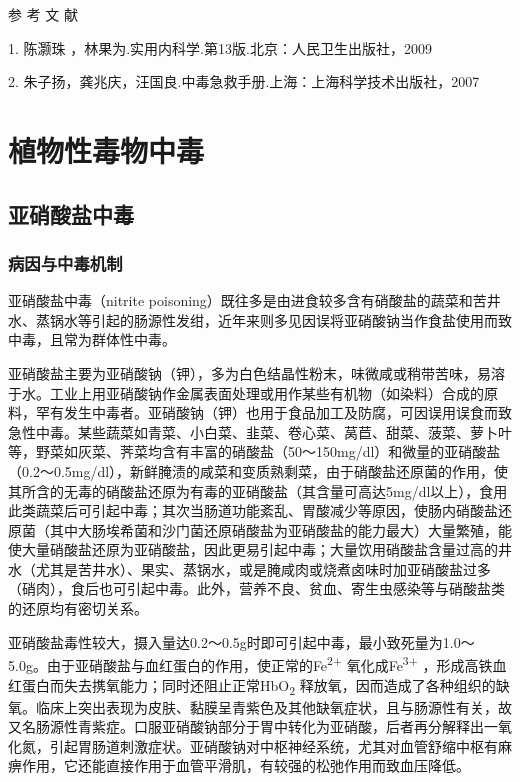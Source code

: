 \hypertarget{text00161.htmlux5cux23CHP5-6-5-1}{}
参 考 文 献

1. 陈灏珠 ，林果为.实用内科学.第13版.北京：人民卫生出版社，2009

2. 朱子扬，龚兆庆，汪国良.中毒急救手册.上海：上海科学技术出版社，2007

\protect\hypertarget{text00162.html}{}{}

\chapter{植物性毒物中毒}

\section{亚硝酸盐中毒}

\subsection{病因与中毒机制}

亚硝酸盐中毒（nitrite
poisoning）既往多是由进食较多含有硝酸盐的蔬菜和苦井水、蒸锅水等引起的肠源性发绀，近年来则多见因误将亚硝酸钠当作食盐使用而致中毒，且常为群体性中毒。

亚硝酸盐主要为亚硝酸钠（钾），多为白色结晶性粉末，味微咸或稍带苦味，易溶于水。工业上用亚硝酸钠作金属表面处理或用作某些有机物（如染料）合成的原料，罕有发生中毒者。亚硝酸钠（钾）也用于食品加工及防腐，可因误用误食而致急性中毒。某些蔬菜如青菜、小白菜、韭菜、卷心菜、莴苣、甜菜、菠菜、萝卜叶等，野菜如灰菜、荠菜均含有丰富的硝酸盐（50～150mg/dl）和微量的亚硝酸盐（0.2～0.5mg/dl），新鲜腌渍的咸菜和变质熟剩菜，由于硝酸盐还原菌的作用，使其所含的无毒的硝酸盐还原为有毒的亚硝酸盐（其含量可高达5mg/dl以上），食用此类蔬菜后可引起中毒；其次当肠道功能紊乱、胃酸减少等原因，使肠内硝酸盐还原菌（其中大肠埃希菌和沙门菌还原硝酸盐为亚硝酸盐的能力最大）大量繁殖，能使大量硝酸盐还原为亚硝酸盐，因此更易引起中毒；大量饮用硝酸盐含量过高的井水（尤其是苦井水）、果实、蒸锅水，或是腌咸肉或烧煮卤味时加亚硝酸盐过多（硝肉），食后也可引起中毒。此外，营养不良、贫血、寄生虫感染等与硝酸盐类的还原均有密切关系。

亚硝酸盐毒性较大，摄入量达0.2～0.5g时即可引起中毒，最小致死量为1.0～5.0g。由于亚硝酸盐与血红蛋白的作用，使正常的Fe\textsuperscript{2+}
氧化成Fe\textsuperscript{3+}
，形成高铁血红蛋白而失去携氧能力；同时还阻止正常HbO\textsubscript{2}
释放氧，因而造成了各种组织的缺氧。临床上突出表现为皮肤、黏膜呈青紫色及其他缺氧症状，且与肠源性有关，故又名肠源性青紫症。口服亚硝酸钠部分于胃中转化为亚硝酸，后者再分解释出一氧化氮，引起胃肠道刺激症状。亚硝酸钠对中枢神经系统，尤其对血管舒缩中枢有麻痹作用，它还能直接作用于血管平滑肌，有较强的松弛作用而致血压降低。

